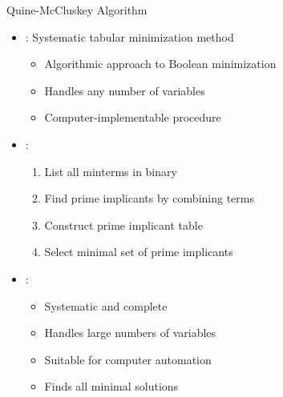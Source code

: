 \begin{frame}{Quine-McCluskey Algorithm}
\begin{itemize}
\item {}: Systematic tabular minimization method
\begin{itemize}
\item Algorithmic approach to Boolean minimization
\item Handles any number of variables
\item Computer-implementable procedure
\end{itemize}
\vspace{0.5cm}
\item {}:
\begin{enumerate}
\item List all minterms in binary
\item Find prime implicants by combining terms
\item Construct prime implicant table
\item Select minimal set of prime implicants
\end{enumerate}
\vspace{0.3cm}
\item {}:
\begin{itemize}
\item Systematic and complete
\item Handles large numbers of variables
\item Suitable for computer automation
\item Finds all minimal solutions
\end{itemize}
\end{itemize}
\end{frame}

